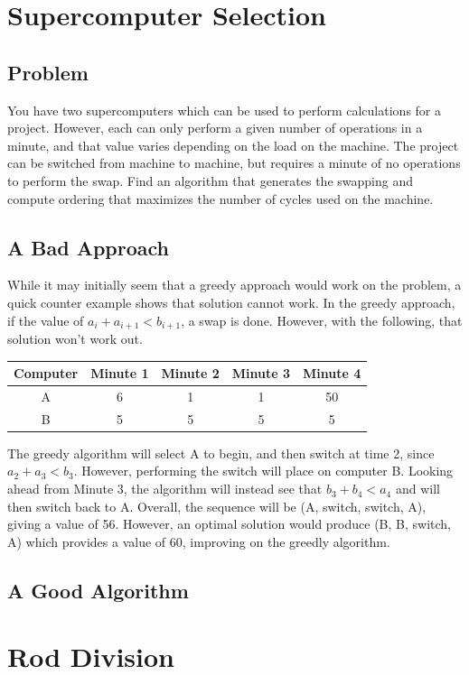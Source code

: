 \documentclass[titlepage]{article}
\numberwithin{equation}{subsection}
\begin{document}
\section{Supercomputer Selection}
\subsection{Problem}
You have two supercomputers which can be used to perform calculations for a project. However, each can only perform
a given number of operations in a minute, and that value varies depending on the load on the machine. The project can
be switched from machine to machine, but requires a minute of no operations to perform the swap. Find an algorithm
that generates the swapping and compute ordering that maximizes the number of cycles used on the machine.
\subsection{A Bad Approach}
While it may initially seem that a greedy approach would work on the problem, a quick counter example shows that
solution cannot work. In the greedy approach, if the value of $a_i + a_{i+1} < b_{i+1}$, a swap is done. However,
with the following, that solution won't work out. 
\begin{center}
  \begin{tabular}{|c|c|c|c|c|}
    \hline
  Computer & Minute 1 & Minute 2 & Minute 3 & Minute 4\\ \hline
  A & 6 & 1 & 1 & 50 \\
  B & 5 & 5 & 5 & 5  \\
  \hline
  \end{tabular}
\end{center}
The greedy algorithm will select A to begin, and then switch at time 2, since $a_2 + a_3 < b_3$. However, performing
the switch will place on computer B. Looking ahead from Minute 3, the algorithm will instead see that $b_3 + b_4 < a_4$
and will then switch back to A. Overall, the sequence will be (A, switch, switch, A), giving a value of 56. However,
an optimal solution would produce (B, B, switch, A) which provides a value of 60, improving on the greedly algorithm.
\subsection{A Good Algorithm}
\section{Rod Division}
\end{document}
